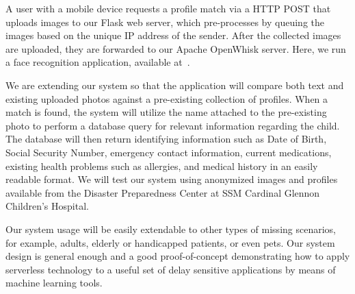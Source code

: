 \documentclass[sigconf]{acmart}
\begin{document}
\begin{titlepage}
A user with a mobile device requests a profile match via a HTTP POST that uploads images to our Flask web server, which  pre-processes by queuing the images based on the unique IP address of the sender. After the collected images are uploaded, they are forwarded to our Apache OpenWhisk server. Here, we run a face recognition application, available at~\cite{ageitgey}.  

We are extending our system so that the application will compare both text and existing uploaded photos against a pre-existing collection of profiles. When a match is found, the system will utilize the name attached to the pre-existing photo to perform a database query for relevant information regarding the child. The database will then return identifying information such as Date of Birth, Social Security Number, emergency contact information, current medications, existing health problems such as allergies, and medical history in an easily readable format. We will test our system using anonymized images and profiles available from the Disaster Preparedness Center at SSM Cardinal Glennon Children's Hospital.

Our system usage will be easily extendable to other types of missing scenarios, for example, adults, elderly or handicapped patients, or even pets. Our system design is general enough and a good proof-of-concept demonstrating how to apply serverless technology to a useful set of delay sensitive applications by means of machine learning tools.



 
\end{titlepage}
\end{document}
